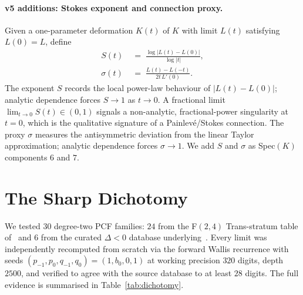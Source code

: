\documentclass[12pt]{amsart}
\theoremstyle{definition}
\begin{document}
\paragraph{v5 additions: Stokes exponent and connection proxy.}
Given a one-parameter deformation $K(t)$ of $K$ with limit $L(t)$
satisfying $L(0)=L$, define
\begin{align}
S(t) &\;=\; \frac{\log|L(t)-L(0)|}{\log|t|}, \label{eq:S} \\
\sigma(t) &\;=\; \frac{L(t)-L(-t)}{2t\,L'(0)}. \label{eq:sigma}
\end{align}
The exponent $S$ records the local power-law behaviour of $|L(t)-L(0)|$;
analytic dependence forces $S\to 1$ as $t\to 0$. A fractional limit
$\lim_{t\to 0}S(t)\in(0,1)$ signals a non-analytic, fractional-power
singularity at $t=0$, which is the qualitative signature of a
Painlev\'e/Stokes connection. The proxy $\sigma$ measures the antisymmetric
deviation from the linear Taylor approximation; analytic dependence forces
$\sigma\to 1$. We add $S$ and $\sigma$ as Spec$(K)$ components $6$ and $7$.

\section{The Sharp Dichotomy}\label{sec:dichotomy}

We tested $30$ degree-two PCF families: $24$ from the F$(2,4)$
Trans-stratum table of~\cite{Papanokechi2026F24} and $6$ from the curated
$\Delta<0$ database underlying~\cite{Papanokechi2026Vquad,pcfdatabase2026}. Every limit
was independently recomputed from scratch via the forward Wallis
recurrence with seeds $(p_{-1},p_{0},q_{-1},q_{0})=(1,b_{0},0,1)$ at
working precision $320$ digits, depth $2500$, and verified to agree with
the source database to at least $28$ digits. The full evidence is
summarised in Table~\ref{tab:dichotomy}.
\end{document}
